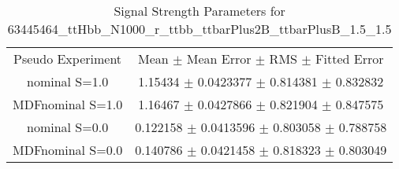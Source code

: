 \begin{table}
\centering
\caption{Signal Strength Parameters for 63445464\_ttHbb\_N1000\_r\_ttbb\_ttbarPlus2B\_ttbarPlusB\_1.5\_1.5}
\begin{tabular}{cc}
\toprule
Pseudo Experiment & Mean $\pm$ Mean Error $\pm$ RMS $\pm$ Fitted Error\\
nominal S=1.0 & \num{1.15434} $\pm$ \num{0.0423377} $\pm$ \num{0.814381} $\pm$ \num{0.832832}\\
MDFnominal S=1.0 & \num{1.16467} $\pm$ \num{0.0427866} $\pm$ \num{0.821904} $\pm$ \num{0.847575}\\
nominal S=0.0 & \num{0.122158} $\pm$ \num{0.0413596} $\pm$ \num{0.803058} $\pm$ \num{0.788758}\\
MDFnominal S=0.0 & \num{0.140786} $\pm$ \num{0.0421458} $\pm$ \num{0.818323} $\pm$ \num{0.803049}\\
\bottomrule
\end{tabular}
\end{table}